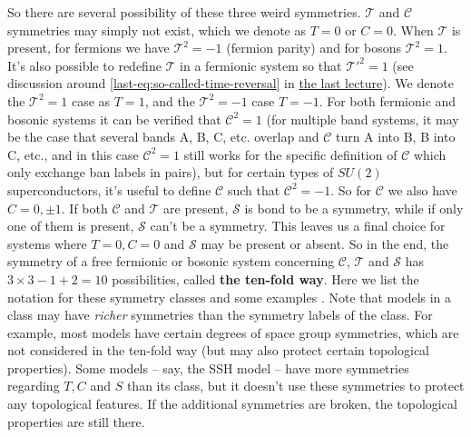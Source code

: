 \documentclass[hyperref, a4paper]{article}
\newcommand*{\concept}[1]{{\textbf{#1}}}
\newcommand{\lastlec}{\href{./2022-3-15.pdf}{the last lecture}}
\begin{document}
So there are several possibility of these three weird symmetries. $\mathcal{T}$ and $\mathcal{C}$ symmetries 
may simply not exist, which we denote as ${T} = 0$ or ${C} = 0$. When $\mathcal{T}$ is present, for fermions 
we have $\mathcal{T}^2 = -1$ (fermion parity) and for bosons $\mathcal{T}^2 = 1$. It's also possible to 
redefine $\mathcal{T}$ in a fermionic system so that $\mathcal{T}'^2 = 1$ (see discussion around \eqref{last-eq:so-called-time-reversal} in \lastlec). We denote the $\mathcal{T}^2 = 1$ case as $T=1$, and the 
$\mathcal{T}^2 = -1$ case $T=-1$. For both fermionic and bosonic systems it can be verified that 
$\mathcal{C}^2 = 1$ (for multiple band systems, it may be the case that several bands A, B, C, etc. overlap
and $\mathcal{C}$ turn A into B, B into C, etc., and in this case $\mathcal{C}^2 = 1$ still works for the 
specific definition of $\mathcal{C}$ which only exchange ban labels in pairs), but for certain types of 
$SU(2)$ superconductors, it's useful to define $\mathcal{C}$ such that $\mathcal{C}^2 = -1$. 
So for $\mathcal{C}$ we also have $C = 0, \pm 1$. If both $\mathcal{C}$ and $\mathcal{T}$ are present, 
$\mathcal{S}$ is bond to be a symmetry, while if only one of them is present, $\mathcal{S}$ can't be 
a symmetry. This leaves us a final choice for systems where $T = 0, C = 0$ and $\mathcal{S}$ may be present 
or absent. So in the end, the symmetry of a free fermionic or bosonic system concerning $\mathcal{C}$, 
$\mathcal{T}$ and $\mathcal{S}$ has $3 \times 3 - 1 + 2 = 10$ possibilities, called \concept{the ten-fold way}. Here we list the notation for these symmetry classes and some examples \cite{Ryu_2010}. Note that 
models in a class may have \emph{richer} symmetries than the symmetry labels of the class. For example, 
most models have certain degrees of space group symmetries, which are not considered in the ten-fold way (but 
may also protect certain topological properties). Some models -- say, the SSH model -- have more symmetries
regarding $T, C$ and $S$ than its class, but it doesn't use these symmetries to protect any topological features.
If the additional symmetries are broken, the topological properties are still there.
\end{document}
